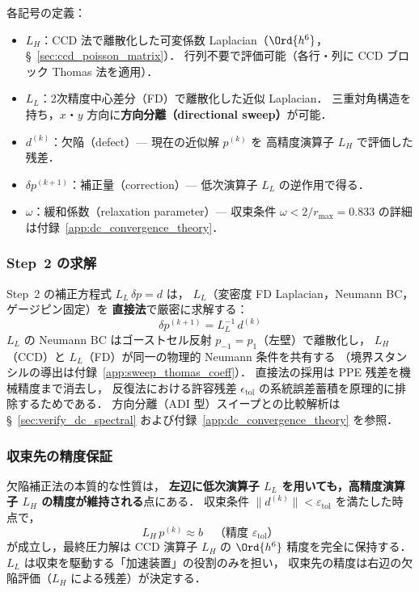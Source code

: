 各記号の定義：
\begin{itemize}
  \item $L_H$：CCD 法で離散化した可変係数 Laplacian（$\Ord{h^6}$，§~\ref{sec:ccd_poisson_matrix}）．
        行列不要で評価可能（各行・列に CCD ブロック Thomas 法を適用）．
  \item $L_L$：2次精度中心差分（FD）で離散化した近似 Laplacian．
        三重対角構造を持ち，$x$・$y$ 方向に\textbf{方向分離（directional sweep）}が可能．
  \item $d^{(k)}$：欠陥（defect）— 現在の近似解 $p^{(k)}$ を
        高精度演算子 $L_H$ で評価した残差．
  \item $\delta p^{(k+1)}$：補正量（correction）— 低次演算子 $L_L$ の逆作用で得る．
  \item $\omega$：緩和係数（relaxation parameter）—
        収束条件 $\omega < 2/r_{\max} = 0.833$ の詳細は付録~\ref{app:dc_convergence_theory}．
\end{itemize}

\subsubsection{Step~2 の求解}
\label{sec:dc_sweep}

Step~2 の補正方程式 $L_L\,\delta p = d$ は，
$L_L$（変密度 FD Laplacian，Neumann BC，ゲージピン固定）を
\textbf{直接法}で厳密に求解する：
\begin{equation}
  \delta p^{(k+1)} = L_L^{-1}\,d^{(k)}
  \label{eq:dc_step2_lu}
\end{equation}
$L_L$ の Neumann BC はゴーストセル反射 $p_{-1}=p_1$（左壁）で離散化し，
$L_H$（CCD）と $L_L$（FD）が同一の物理的 Neumann 条件を共有する
（境界スタンシルの導出は付録~\ref{app:sweep_thomas_coeff}）．
直接法の採用は PPE 残差を機械精度まで消去し，
反復法における許容残差 $\epsilon_\mathrm{tol}$ の系統誤差蓄積を原理的に排除するためである．
方向分離（ADI 型）スイープとの比較解析は §~\ref{sec:verify_dc_spectral} および付録~\ref{app:dc_convergence_theory} を参照．

\subsubsection{収束先の精度保証}
\label{sec:dc_accuracy}

欠陥補正法の本質的な性質は，
\textbf{左辺に低次演算子 $L_L$ を用いても，高精度演算子 $L_H$ の精度が維持される}点にある．
収束条件 $\|d^{(k)}\| < \varepsilon_\mathrm{tol}$ を満たした時点で，
\begin{equation}
  L_H\,p^{(k)} \approx b
  \quad\text{（精度 $\varepsilon_\mathrm{tol}$）}
\end{equation}
が成立し，最終圧力解は CCD 演算子 $L_H$ の $\Ord{h^6}$ 精度を完全に保持する．
$L_L$ は収束を駆動する「加速装置」の役割のみを担い，
収束先の精度は右辺の欠陥評価（$L_H$ による残差）が決定する．

